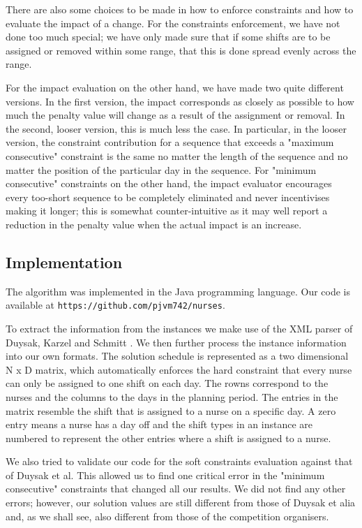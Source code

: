 \documentclass{article}
\begin{document}
There are also some choices to be made in how to enforce constraints and how to evaluate the impact of a change.
For the constraints enforcement, we have not done too much special; we have only made sure that if some shifts are to be assigned or removed within some range, that this is done spread evenly across the range.

For the impact evaluation on the other hand, we have made two quite different versions.
In the first version, the impact corresponds as closely as possible to how much the penalty value will change as a result of the assignment or removal.
In the second, looser version, this is much less the case.
In particular, in the looser version, the constraint contribution for a sequence that exceeds a "maximum consecutive" constraint is the same no matter the length of the sequence and no matter the position of the particular day in the sequence.
For "minimum consecutive" constraints on the other hand, the impact evaluator encourages every too-short sequence to be completely eliminated and never incentivises making it longer; this is somewhat counter-intuitive as it may well report a reduction in the penalty value when the actual impact is an increase.

\subsection{Implementation}

The algorithm was implemented in the Java programming language.
Our code is available at \texttt{https://github.com/pjvm742/nurses}.

To extract the information from the instances we make use of the XML parser of Duysak, Karzel and Schmitt \cite{DKS}.
We then further process the instance information into our own formats.
The solution schedule is represented as a two dimensional N x D matrix, which automatically enforces the hard constraint that every nurse can only be assigned to one shift on each day.
The rowns correspond to the nurses and the columns to the days in the planning period.
The entries in the matrix resemble the shift that is assigned to a nurse on a specific day.
A zero entry means a nurse has a day off and the shift types in an instance are numbered to represent the other entries where a shift is assigned to a nurse.

We also tried to validate our code for the soft constraints evaluation against that of Duysak et al.
This allowed us to find one critical error in the "minimum consecutive" constraints that changed all our results.
We did not find any other errors; however, our solution values are still different from those of Duysak et alia and, as we shall see, also different from those of the competition organisers.
\end{document}
